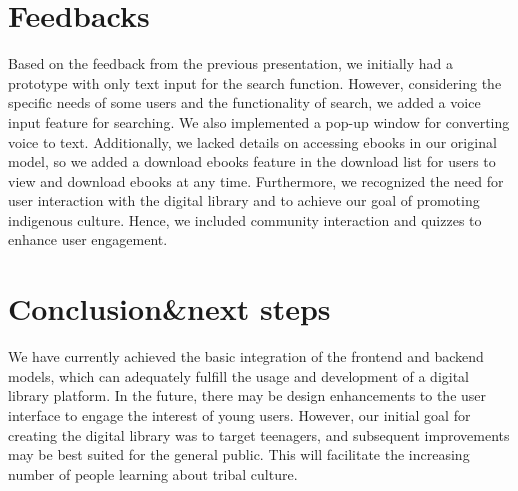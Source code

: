 \chapter{Feedbacks}
Based on the feedback from the previous presentation, we initially had a prototype with only text input for the search function. However, considering the specific needs of some users and the functionality of search, we added a voice input feature for searching. We also implemented a pop-up window for converting voice to text. Additionally, we lacked details on accessing ebooks in our original model, so we added a download ebooks feature in the download list for users to view and download ebooks at any time. Furthermore, we recognized the need for user interaction with the digital library and to achieve our goal of promoting indigenous culture. Hence, we included community interaction and quizzes to enhance user engagement.


\chapter{Conclusion\&next steps} 

We have currently achieved the basic integration of the frontend and backend models, which can adequately fulfill the usage and development of a digital library platform. In the future, there may be design enhancements to the user interface to engage the interest of young users. However, our initial goal for creating the digital library was to target teenagers, and subsequent improvements may be best suited for the general public. This will facilitate the increasing number of people learning about tribal culture.


